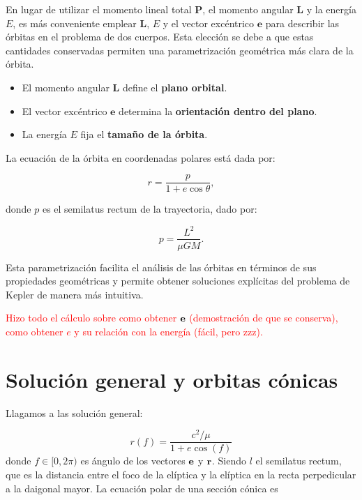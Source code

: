 En lugar de utilizar el momento lineal total \( \mathbf{P} \), el momento angular \( \mathbf{L} \) y la energía \( E \), es más conveniente emplear \( \mathbf{L} \), \( E \) y el vector excéntrico \( \mathbf{e} \) para describir las órbitas en el problema de dos cuerpos. Esta elección se debe a que estas cantidades conservadas permiten una parametrización geométrica más clara de la órbita.

\begin{itemize}
    \item El momento angular \( \mathbf{L} \) define el \textbf{plano orbital}.
    \item El vector excéntrico \( \mathbf{e} \) determina la \textbf{orientación dentro del plano}.
    \item La energía \( E \) fija el \textbf{tamaño de la órbita}. 
\end{itemize}

La ecuación de la órbita en coordenadas polares está dada por:

\begin{equation}
    r = \frac{p}{1 + e \cos\theta},
\end{equation}

donde \( p \) es el semilatus rectum de la trayectoria, dado por:

\begin{equation}
    p = \frac{L^2}{\mu G M}.
\end{equation}

Esta parametrización facilita el análisis de las órbitas en términos de sus propiedades geométricas y permite obtener soluciones explícitas del problema de Kepler de manera más intuitiva.


\begin{Anotacion}
    \textcolor{red}{Hizo todo el cálculo sobre como obtener $\mathbf{e}$ (demostración de que se conserva), como obtener $e$ y su relación con la energía (fácil, pero zzz).}
\end{Anotacion}

\section{Solución general y orbitas cónicas}

Llagamos a las solución general:

\begin{equation}
    r(f) = \frac{c^2 / \mu}{1+e\cos (f)}
\end{equation}
donde $f \in [0,2\pi)$ es ángulo de los vectores $\mathbf{e}$ y $\mathbf{r}$. Siendo $l$ el semilatus rectum, que es la distancia entre el foco de la elíptica y la elíptica en la recta perpedicular a la daigonal mayor. La ecuación polar de una sección cónica es 

